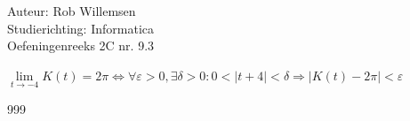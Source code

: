 \documentclass[a4paper]{article}
\begin{document}
\noindent \large Auteur: Rob Willemsen \\
\noindent \large Studierichting: Informatica\\
\noindent \large Oefeningenreeks 2C nr. 9.3\\

\medskip

\normalsize

$\lim\limits_{t \rightarrow -4} K(t) = 2\pi \Leftrightarrow \forall \varepsilon > 0, \exists \delta > 0 : 0 < |t + 4| < \delta \Rightarrow |K(t) - 2\pi| < \varepsilon$ \\

\begin{thebibliography}{999}
\end{thebibliography}
\end{document}
